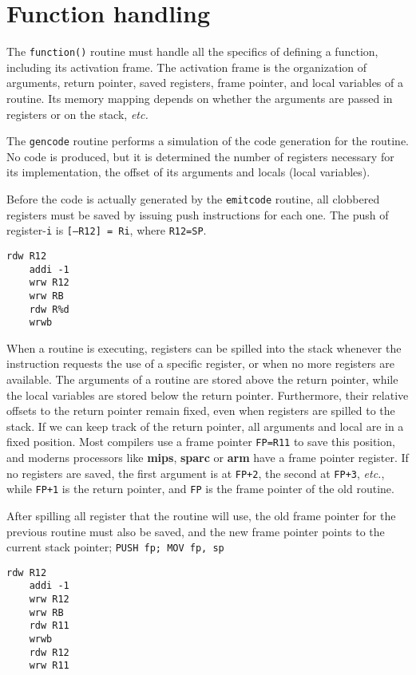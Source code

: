 \section{Function handling}
The {\tt function()} routine must handle all the specifics
of defining a function, including its activation frame.
The activation frame is the organization of arguments,
return pointer, saved registers, frame pointer, and
local variables of a routine.
Its memory mapping depends on whether the arguments are
passed in registers or on the stack, {\it etc.}

The {\tt gencode} routine performs a simulation of the
code generation for the routine.
No code is produced, but it is determined the number of
registers necessary for its implementation, the offset
of its arguments and locals (local variables).

Before the code is actually generated by the {\tt emitcode}
routine, all clobbered registers must be saved by issuing
push instructions for each one.
The push of register-{\tt i} is {\tt [--R12] = Ri}, where
{\tt R12=SP}.
\begin{Verbatim}[baselinestretch=1.2]
    rdw R12
    addi -1
    wrw R12
    wrw RB
    rdw R%d
    wrwb
\end{Verbatim}

When a routine is executing, registers can be spilled
into the stack whenever the instruction requests the
use of a specific register, or when no more registers
are available.
The arguments of a routine are stored above the
return pointer, while the local variables are stored below
the return pointer.
Furthermore, their relative offsets to the return pointer
remain fixed, even when registers are spilled to the stack.
If we can keep track of the return pointer, all arguments
and local are in a fixed position.
Most compilers use a frame pointer {\tt FP=R11} to save
this position, and moderns processors like {\bf mips},
{\bf sparc} or {\bf arm} have a frame pointer register.
If no registers are saved, the first argument is at
{\tt FP+2}, the second at {\tt FP+3}, {\it etc.},
while {\tt FP+1} is the return pointer, and {\tt FP}
is the frame pointer of the old routine.

After spilling all register that the routine will use,
the old frame pointer for the previous routine must
also be saved, and the new frame pointer points to
the current stack pointer; {\tt PUSH fp; MOV fp, sp}
\begin{Verbatim}[baselinestretch=1.2]
    rdw R12
    addi -1
    wrw R12
    wrw RB
    rdw R11
    wrwb
    rdw R12
    wrw R11
\end{Verbatim}

